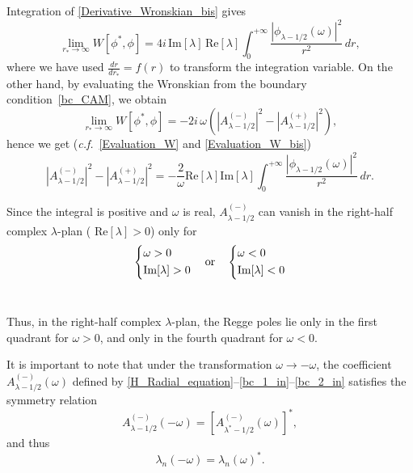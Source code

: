\documentclass[aps,prd,longbibliography,reprint,twocolumn,amsmath,amssymb,amsfonts,showpacs,footnote,superscriptaddress]{revtex4-1}%
\begin{document}
Integration of \eqref{Derivative_Wronskian_bis} gives
\begin{equation}\label{Evaluation_W}
\lim_{r_*\rightarrow \infty}  W[\phi^*,\phi] = 4i\, \text{Im}[\lambda]\, \text{Re}[\lambda] \int_{0}^{+\infty} \frac{|\phi_{\lambda-1/2}(\omega)|^2}{r^2}\,dr ,
\end{equation}
where we have used $\frac{dr}{dr_*}=f(r)$ to transform the integration variable. On the other hand,  by evaluating the  Wronskian from the boundary condition~\eqref{bc_CAM}, we obtain
\begin{equation}\label{Evaluation_W_bis}
\lim_{r_*\rightarrow \infty}  W[\phi^*,\phi] =-2i\, \omega\left(|A^{(-)}_{\lambda-1/2}|^2-|A^{(+)}_{\lambda-1/2}|^2\right),
\end{equation}
hence we get (\textit{c.f.}~\eqref{Evaluation_W} and  \eqref{Evaluation_W_bis})
\begin{equation}\label{Evaluation_W_bis_1}
  |A^{(-)}_{\lambda-1/2}|^2-|A^{(+)}_{\lambda-1/2}|^2 = -\frac{2}{\omega}\text{Re}[\lambda]\text{Im}[\lambda]\int_{0}^{+\infty} \frac{ |\phi_{\lambda-1/2}(\omega)|^2}{r^2}\,dr.
\end{equation}

Since the integral is positive and $\omega$ is real, $A^{(-)}_{\lambda-1/2}$ can  vanish in the right-half complex $\lambda$-plan ( $\text{Re}[\lambda] >0 $) only for
\begin{equation}
    \begin{dcases}
        \omega>0 \\
        \text{Im}[\lambda]>0
     \end{dcases}
\quad\text{or}\quad
    \begin{dcases}
      \omega<0 \\
        \text{Im}[\lambda]<0
    \end{dcases}
\end{equation}\

Thus, in the right-half complex $\lambda$-plan, the Regge poles lie only in the first quadrant for $\omega > 0$, and only in the fourth quadrant for $\omega < 0$.

It is important to note that under the transformation $\omega \rightarrow -\omega$, the coefficient $A^{(-)}_{\lambda-1/2}(\omega)$ defined by \eqref{H_Radial_equation}--\eqref{bc_1_in}--\eqref{bc_2_in} satisfies the symmetry relation
\begin{equation}\label{symmetry_relation}
 A^{(-)}_{\lambda-1/2}(-\omega) = \left[A^{(-)}_{\lambda^*-1/2}(\omega)\right]^*,
\end{equation}
and thus
\begin{equation}\label{Relation_1st_4th}
\lambda_n(-\omega) = \lambda_n(\omega)^*.
\end{equation}
\end{document}
